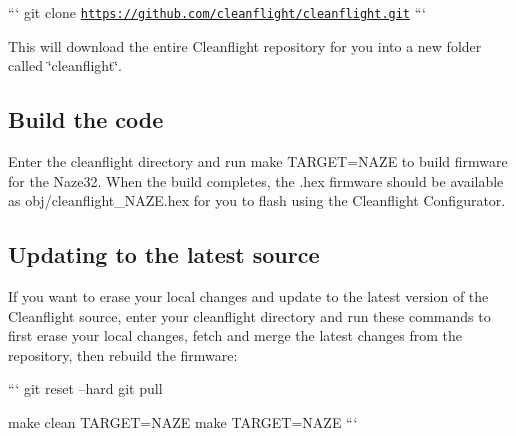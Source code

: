 ``` git clone \href{https://github.com/cleanflight/cleanflight.git}{\tt https\+://github.\+com/cleanflight/cleanflight.\+git} ```

This will download the entire Cleanflight repository for you into a new folder called \char`\"{}cleanflight\char`\"{}.

\subsection*{Build the code}

Enter the cleanflight directory and run {\ttfamily make T\+A\+R\+G\+E\+T=N\+A\+Z\+E} to build firmware for the Naze32. When the build completes, the .hex firmware should be available as {\ttfamily obj/cleanflight\+\_\+\+N\+A\+Z\+E.\+hex} for you to flash using the Cleanflight Configurator.

\subsection*{Updating to the latest source}

If you want to erase your local changes and update to the latest version of the Cleanflight source, enter your cleanflight directory and run these commands to first erase your local changes, fetch and merge the latest changes from the repository, then rebuild the firmware\+:

``` git reset --hard git pull

make clean T\+A\+R\+G\+E\+T=N\+A\+Z\+E make T\+A\+R\+G\+E\+T=N\+A\+Z\+E ``` 